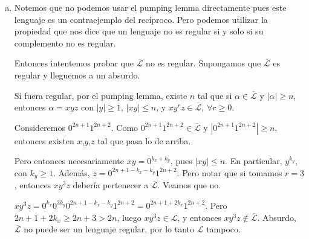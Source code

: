 \documentclass[hidelinks,a4paper,11pt, nofootinbib]{article}
\newcommand{\ele}{\mathcal{L}}
\newcommand{\elecomp}{\overline{\ele}}
\begin{document}
\begin{enumerate}[a.]
\item Notemos que no podemos usar el pumping lemma directamente pues este lenguaje es un contraejemplo del recíproco.
Pero podemos utilizar la propiedad que nos dice que un lenguaje no es regular si y solo si su complemento no es regular.

Entonces intentemos probar que $\overline{\ele}$ no es regular.
Supongamos que $\overline{\ele}$ es regular y lleguemos a un absurdo.

Si fuera regular, por el pumping lemma,
  existe $n$ tal que si $\alpha \in \elecomp$ y $|\alpha| \geq n$,
  entonces $\alpha = xyz$ con $|y| \geq 1$, $|x y| \leq n$, y $xy^rz \in \elecomp$, $\forall r \geq 0$.

Consideremos $0^{2n+1}1^{2n+2}$. Como $0^{2n+1}1^{2n+2} \in \elecomp$ y $|0^{2n+1}1^{2n+2}| \geq n$,
entonces existen $x$,$y$,$z$ tal que pasa lo de arriba.

Pero entonces necesariamente $xy = 0^{k_x + k_y}$, pues $|x y| \leq n$.
En particular, $y^{k_y}$, con $k_y \geq 1$. Además, $z = 0^{2n+1-k_x-k_y}1^{2n+2}$.
Pero notar que si tomamos $r = 3$, entonces $xy^3z$ debería pertenecer a $\elecomp$. Veamos que no.

$xy^3z = 0^{k_x} 0^{3 k_y} 0^{2n+1-k_x-k_y}1^{2n+2} = 0^{2n+1+2k_x} 1^{2n+2}$.
Pero $2n + 1 + 2k_x \geq 2n + 3 > 2n$, luego $xy^3z \in \ele$, y entonces $xy^3z \not\in \elecomp$.
Absurdo, $\elecomp$ no puede ser un lenguaje regular, por lo tanto $\ele$ tampoco.


\end{enumerate}
\end{document}
